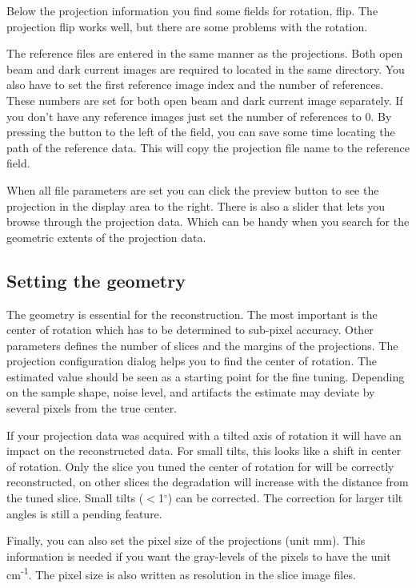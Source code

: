 \documentclass[a4paper]{scrreprt}
\begin{document}
Below the projection information you find some fields for rotation, flip. The projection flip works well, but there are some problems with the rotation.

The reference files are entered in the same manner as the projections. Both open beam and dark current images are required to located in the same directory. You also have to set the first reference image index and the number of references. These numbers are set for both open beam and dark current image separately. If you don't have any reference images just set the number of references to 0. By pressing the button to the left of the field, you can save some time locating the path of the reference data. This will copy the projection file name to the reference field.

When all file parameters are set you can click the preview button to see the projection in the display area to the right. There is also a slider that lets you browse through the projection data. Which can be handy when you search for the geometric extents of the projection data.

\subsection{Setting the geometry}
The geometry is essential for the reconstruction. The most important is the center of rotation which has to be determined to sub-pixel accuracy. Other parameters defines the number of slices and the margins of the projections. The projection configuration dialog helps you to find the center of rotation. The estimated value should be seen as a starting point for the fine tuning. Depending on the sample shape, noise level, and artifacts the estimate may deviate by several pixels from the true center. 

If your projection data was acquired with a tilted axis of rotation it will have an impact on the reconstructed data. For small tilts, this looks like a shift in center of rotation. Only the slice you tuned the center of rotation for will be correctly reconstructed, on other slices the degradation will increase with the distance from the tuned slice. 
Small tilts ($<$1$^{\circ}$) can be corrected. The correction for larger tilt angles is still a pending feature.

Finally, you can also set the pixel size of the projections (unit mm). This information is needed if you want the gray-levels of the pixels to have the unit cm\textsuperscript{-1}. The pixel size is also written as resolution in the slice image files.
\end{document}

